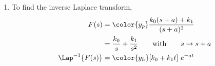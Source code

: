\begin{enumerate}
      \item To find the inverse Laplace transform,
            \begin{align}
                  F(s)              & = \color{y_p} \frac{k_0(s+a) + k_1}
                  {(s+a)^2}                                               \\
                                    & = \frac{k_0}{s} + \frac{k_1}{s^2}
                  \qquad \text{with} \qquad s \rightarrow s+a             \\
                  \Lap^{-1}\{F(s)\} & =  \color{y_h} [k_0 + k_1 t]\ e^{-at}
            \end{align}
\end{enumerate}